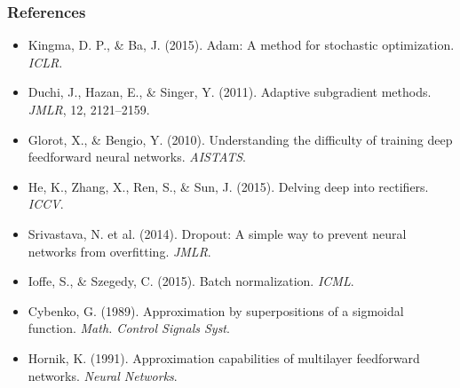 \documentclass[notes,11pt, aspectratio=169]{beamer}
\begin{document}
\begin{frame}
\frametitle{References}

\footnotesize
\begin{itemize}
    \item Kingma, D. P., \& Ba, J. (2015). Adam: A method for stochastic optimization. \textit{ICLR}.
    \item Duchi, J., Hazan, E., \& Singer, Y. (2011). Adaptive subgradient methods. \textit{JMLR}, 12, 2121--2159.
    \item Glorot, X., \& Bengio, Y. (2010). Understanding the difficulty of training deep feedforward neural networks. \textit{AISTATS}.
    \item He, K., Zhang, X., Ren, S., \& Sun, J. (2015). Delving deep into rectifiers. \textit{ICCV}.
    \item Srivastava, N. et al. (2014). Dropout: A simple way to prevent neural networks from overfitting. \textit{JMLR}.
    \item Ioffe, S., \& Szegedy, C. (2015). Batch normalization. \textit{ICML}.
    \item Cybenko, G. (1989). Approximation by superpositions of a sigmoidal function. \textit{Math. Control Signals Syst}.
    \item Hornik, K. (1991). Approximation capabilities of multilayer feedforward networks. \textit{Neural Networks}.
\end{itemize}
\end{frame}
\end{document}
